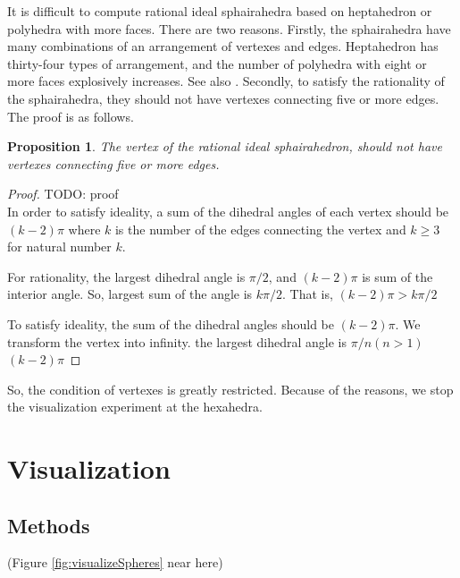 \documentclass[suppldata, dvipdfmx]{interact}
\theoremstyle{plain}%
\newtheorem{proposition}[theorem]{Proposition}
\theoremstyle{definition}
\theoremstyle{remark}
\theoremstyle{problemstyle}
\begin{document}
It is difficult to compute rational ideal sphairahedra based on
heptahedron or polyhedra with more faces.
There are two reasons.
Firstly, the sphairahedra have many combinations of an arrangement of
vertexes and edges. 
Heptahedron has thirty-four types of arrangement, and
the number of polyhedra with eight or more faces explosively
increases. See also \cite{countingPolyhedra}.
Secondly, to satisfy the rationality of the sphairahedra, they should not
have vertexes connecting five or more edges.
The proof is as follows.

\begin{proposition}
 The vertex of the rational ideal sphairahedron, should not
 have vertexes connecting five or more edges.
\end{proposition}

\begin{proof}
 TODO: proof\\
 In order to satisfy ideality, a sum of the dihedral angles of each vertex
 should be $(k - 2) \pi$ where $k$ is the number of the edges connecting
 the vertex and $k \geq 3$ for natural number $k$.

 For rationality, 
 the largest dihedral angle is $\pi / 2$, and 
 $(k-2)\pi$ is sum of the interior angle.
 So, largest sum of the angle is $k\pi / 2$.
 That is,  $(k -  2)\pi > k\pi / 2$

 To satisfy ideality, the sum of the dihedral angles should be $(k - 2)
 \pi$. 
 We transform the vertex into infinity.
 the largest dihedral angle is $\pi / n (n > 1)$
 $(k - 2)\pi$
\end{proof}

So, the condition of vertexes is greatly restricted.
Because of the reasons, we stop the visualization experiment at the hexahedra.

\section{Visualization}

\subsection{Methods}

\noindent(Figure \ref{fig:visualizeSpheres}
 near here)
\end{document}
